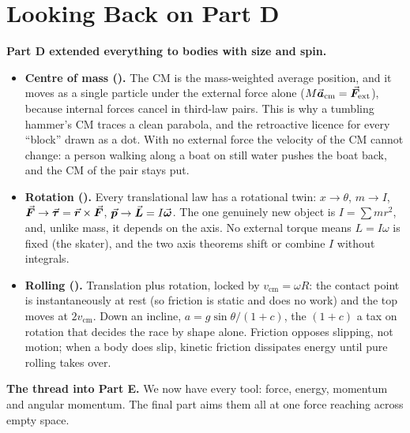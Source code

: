\section*{Looking Back on Part D}

\textbf{Part D extended everything to bodies with size and spin.}
\begin{itemize}
\item \textbf{Centre of mass ().} The CM is the mass-weighted average position, and it moves as a
single particle under the external force alone ($M\vec{\bm{a}}_{\text{cm}}=\vec{\bm{F}}_{\text{ext}}$), because
internal forces cancel in third-law pairs. This is why a tumbling hammer's CM traces a clean parabola, and
the retroactive licence for every ``block'' drawn as a dot. With no external force the velocity of the CM cannot change: a person walking along a boat on still water pushes the boat back, and the CM of the pair stays put.
\item \textbf{Rotation ().} Every translational law has a rotational twin: $x\to\theta$, $m\to I$,
$\vec{\bm{F}}\to\vec{\bm{\tau}}=\vec{\bm{r}}\times\vec{\bm{F}}$, $\vec{\bm{p}}\to\vec{\bm{L}}=I\vec{\bm{\omega}}$. The one genuinely new object is $I=\sum mr^2$, and,
unlike mass, it depends on the axis. No external torque means $L=I\omega$ is fixed (the skater), and the
two axis theorems shift or combine $I$ without integrals.
\item \textbf{Rolling ().} Translation plus rotation, locked by $v_{\text{cm}}=\omega R$: the contact
point is instantaneously at rest (so friction is static and does no work) and the top moves at $2v_{\text{cm}}$.
Down an incline, $a=g\sin\theta/(1+c)$, the $(1+c)$ a tax on rotation that decides the race by shape
alone. Friction opposes slipping, not motion; when a body does slip, kinetic friction dissipates energy until
pure rolling takes over.
\end{itemize}
\textbf{The thread into Part E.} We now have every tool: force, energy, momentum and angular momentum. The
final part aims them all at one force reaching across empty space.

